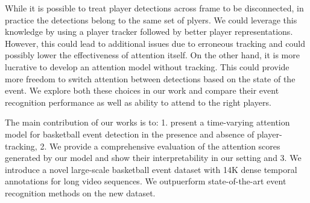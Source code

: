 While it is possible to treat player detections across frame to be
disconnected, in practice the detections belong to the same set of plyers. We
could leverage this knowledge by using a player tracker followed by better
player representations. However, this could lead to additional issues due to
erroneous tracking and could possibly lower the effectiveness of attention
itself. On the other hand, it is more lucrative to develop an attention model
without tracking.  This could provide more freedom to switch attention between
detections based on the state of the event. We explore both these choices in
our work and compare their event recognition performance as well as ability to
attend to the right players.

The main contribution of our works is to:
1. present a time-varying attention model for basketball event detection
in the presence and absence of player-tracking, 2. We provide a comprehensive
evaluation of the attention scores generated by our model and show
their interpretability in our setting and 3. We introduce a novel
large-scale basketball event dataset with 14K dense temporal annotations
for long video sequences. We outpuerform state-of-the-art
event recognition methods on the new dataset.

